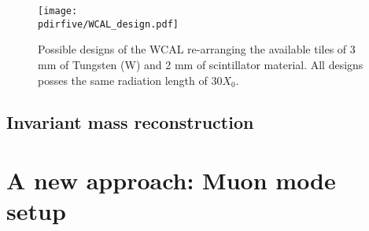 \begin{figure}[tbh!]
  \centering
  \texttt{[image: \\pdirfive/WCAL\_design.pdf]}
  \caption{Possible designs of the WCAL re-arranging the available tiles of 3 mm of Tungsten (W) and 2 mm of scintillator material. All designs posses the same radiation length of 30$X_0$.}
  \label{fig:wcal-design}
\end{figure}

\subsection{Invariant mass reconstruction}
\label{chapter5:sec:new-vismode-setup-invmass}

\section{A new approach: Muon mode setup}
\label{chapter5:sec:muon-mode-setup}
